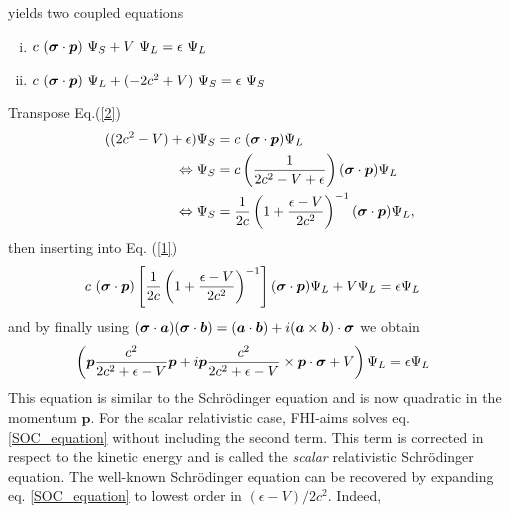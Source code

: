 yields two coupled equations 
	\begin{enumerate}[(i)]
		\item $c ~(\boldsymbol{\sigma} \cdot \boldsymbol{p}) ~\Psi_S + V~\Psi_L = \epsilon~\Psi_L	$ \label{1}
		\item $c ~(\boldsymbol{\sigma} \cdot \boldsymbol{p}) ~\Psi_L + (-2c^2+V)~\Psi_S = \epsilon~\Psi_S$ \label{2}
	\end{enumerate}
Transpose Eq.(\ref{2})
	\begin{align}
		((2c^2 - V) + \epsilon) \Psi_S &= c~(\boldsymbol{\sigma} \cdot \boldsymbol{p})\Psi_L	\\
		\Leftrightarrow
		\Psi_S &= c 
		\left(
			\frac{1}{2c^2 - V + \epsilon} 
		\right) 
		(\boldsymbol{\sigma} \cdot \boldsymbol{p})\Psi_L \\
		\Leftrightarrow
		\Psi_S &= \frac{1}{2c}
		\left(
		{1 + \frac{\epsilon - V}{2c^2}} 
		\right)^{-1} 
		(\boldsymbol{\sigma} \cdot \boldsymbol{p})\Psi_L,
	\end{align}
then inserting into Eq. (\ref{1})
	\begin{align}
		c ~(\boldsymbol{\sigma} \cdot \boldsymbol{p})
		\left[
			\frac{1}{2c}
			\left(
			{1 + \frac{\epsilon - V}{2c^2}} 
			\right)^{-1}
		\right]		
		(\boldsymbol{\sigma} \cdot \boldsymbol{p})\Psi_L
		+ V \Psi_L 
		&= \epsilon \Psi_L
	\end{align}
and by finally using $(\boldsymbol{\sigma} \cdot \boldsymbol{a})(\boldsymbol{\sigma} \cdot \boldsymbol{b}) =  (\boldsymbol{a} \cdot \boldsymbol{b}) + i (\boldsymbol{a} \times \boldsymbol{b}) \cdot \boldsymbol{\sigma} $ 
we obtain
	\begin{align} \label{SOC_equation}
		\left(
			\boldsymbol{p} \frac{c^2}{2c^2 + \epsilon - V} \boldsymbol{p} 
			+ i \boldsymbol{p} \frac{c^2}{2c^2 + \epsilon - V} \times \boldsymbol{p} \cdot \boldsymbol{\sigma} 
			+ V 
		\right) \Psi_L 
		&= \epsilon \Psi_L	
	\end{align}
	This equation is similar to the Schrödinger equation and is now quadratic in the momentum $\boldsymbol p$. For the scalar relativistic case, FHI-aims solves eq. \eqref{SOC_equation} without including the second term. This term is corrected in respect to the kinetic energy and is called the \textit{scalar} relativistic Schrödinger equation. 
	The well-known Schrödinger equation can be recovered by expanding eq. \eqref{SOC_equation} to lowest order in $(\epsilon - V)/2c^2$. Indeed,
